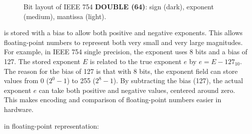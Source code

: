 \begin{figure}[h]
    \caption{Bit layout of IEEE 754 \textbf{DOUBLE (64)}: sign (dark), exponent (medium), mantissa (light).}
    \label{fig:floatformat-double}
\end{figure}



 is stored with a bias to allow both positive and negative exponents. This allows floating-point numbers to represent both 
very small and very large magnitudes.
For example, in IEEE 754 single precision, the exponent uses 8 bits and a bias of 127. 
The stored exponent $E$ is related to the true exponent $e$ by $e = E - 127_{10}$.
The reason for the bias of 127 is that with 8 bits, the exponent field can store values from 0 ($2^0 - 1$) to 255 ($2^8 - 1$).
By subtracting the bias (127), the actual exponent $e$ can take both positive and negative values, centered around zero. 
This makes encoding and comparison of floating-point numbers easier in hardware.



 in floating-point representation:


